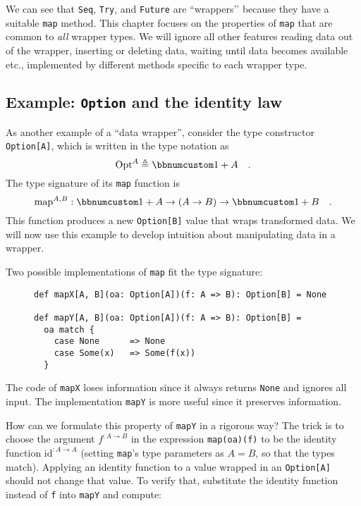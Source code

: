 We can see that \lstinline!Seq!, \lstinline!Try!, and \lstinline!Future!
are \textsf{``}wrappers\textsf{'}' because they have a suitable \lstinline!map! method.
This chapter focuses on the properties of \lstinline!map! that are
common to \emph{all} wrapper types. We will ignore all other features
\textemdash{} reading data out of the wrapper, inserting or deleting
data, waiting until data becomes available etc., \textemdash{} implemented
by different methods specific to each wrapper type.

\subsection{Example: \texttt{Option} and the identity law\label{subsec:f-Example:-Option-and}}

As another example of a \textsf{``}data wrapper\textsf{''}, consider the type constructor
\lstinline!Option[A]!, which is written in the type notation as 
\[
\text{Opt}^{A}\triangleq\bbnum 1+A\quad.
\]
The type signature of its \lstinline!map! function is
\[
\text{map}^{A,B}:\bbnum 1+A\rightarrow\left(A\rightarrow B\right)\rightarrow\bbnum 1+B\quad.
\]
This function produces a new \lstinline!Option[B]! value that wraps
transformed data. We will now use this example to develop intuition
about manipulating data in a wrapper.

Two possible implementations of \lstinline!map! fit the type signature:

\begin{wrapfigure}{l}{0.585\columnwidth}%
\vspace{-0.7\baselineskip}
\begin{lstlisting}
def mapX[A, B](oa: Option[A])(f: A => B): Option[B] = None

def mapY[A, B](oa: Option[A])(f: A => B): Option[B] =
  oa match {
    case None      => None
    case Some(x)   => Some(f(x))
  }
\end{lstlisting}
\vspace{-1\baselineskip}
\end{wrapfigure}%

\noindent The code of \lstinline!mapX! loses information
since it always returns \lstinline!None! and ignores all input. The
implementation \lstinline!mapY! is more useful since it preserves
information. 

How can we formulate this property of \lstinline!mapY! in a rigorous
way? The trick is to choose the argument $f^{:A\rightarrow B}$ in
the expression \lstinline!map(oa)(f)! to be the identity function
$\text{id}^{:A\rightarrow A}$ (setting \lstinline!map!\textsf{'}s type parameters
as $A=B$, so that the types match). Applying an identity function
to a value wrapped in an \lstinline!Option[A]! should not change
that value. To verify that, substitute the identity function instead
of \lstinline!f! into \lstinline!mapY! and compute:

